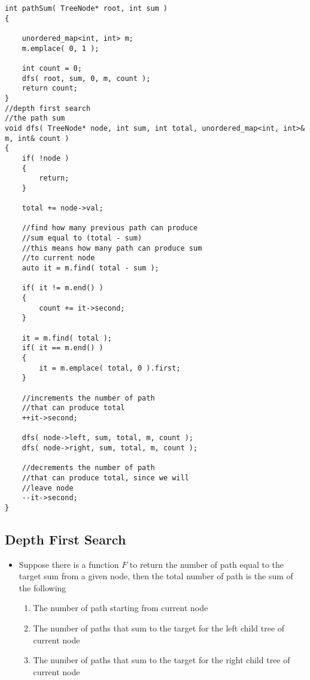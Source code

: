 \setcounter{lstlisting}{0}
\begin{lstlisting}[style=customc, caption={Hash Map}]
int pathSum( TreeNode* root, int sum )
{

    unordered_map<int, int> m;
    m.emplace( 0, 1 );

    int count = 0;
    dfs( root, sum, 0, m, count );
    return count;
}
//depth first search
//the path sum
void dfs( TreeNode* node, int sum, int total, unordered_map<int, int>& m, int& count )
{
    if( !node )
    {
        return;
    }

    total += node->val;

    //find how many previous path can produce
    //sum equal to (total - sum)
    //this means how many path can produce sum
    //to current node
    auto it = m.find( total - sum );

    if( it != m.end() )
    {
        count += it->second;
    }

    it = m.find( total );
    if( it == m.end() )
    {
        it = m.emplace( total, 0 ).first;
    }

    //increments the number of path
    //that can produce total
    ++it->second;

    dfs( node->left, sum, total, m, count );
    dfs( node->right, sum, total, m, count );

    //decrements the number of path
    //that can produce total, since we will
    //leave node
    --it->second;
}
\end{lstlisting}

\subsection{Depth First Search}
\begin{itemize}
\item Suppose there is a function $F$ to return the number of path equal to the target sum from a given node, then the total number of path is the sum of the following
\begin{enumerate}
\item The number of path starting from current node
\item The number of paths that sum to the target for the left child tree of current node
\item The number of paths that sum to the target for the right child tree of current node
\end{enumerate}
\end{itemize}

